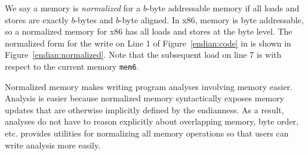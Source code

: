 We say a memory is \emph{normalized} for a $b$-byte addressable memory
if all loads and stores are exactly $b$-bytes and $b$-byte
aligned. In x86, memory is byte addressable, so a
normalized memory for x86 has all loads and stores at the byte
level. The normalized form for the write on Line 1 of
Figure~\ref{endian:code} in \bil is shown in
Figure~\ref{endian:normalized}.  Note that the subsequent load on line 7
is with respect to the current memory {\tt mem6}.

Normalized memory makes writing program analyses involving memory
easier.  Analysis is easier because normalized memory syntactically
exposes memory updates that are otherwise implicitly defined by the
endianness.  As a result, analyses do not have to reason explicitly
about overlapping memory, byte order, etc. \bap provides utilities for
normalizing all memory operations so that users can write analysis
more easily.












